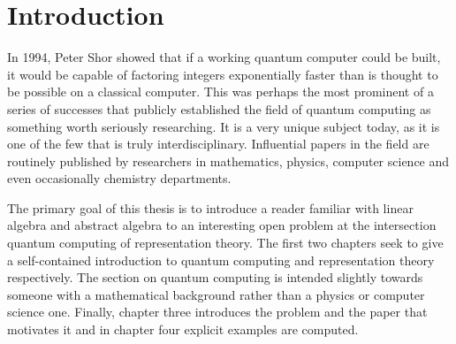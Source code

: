 \chapter*{Introduction}


In 1994, Peter Shor showed that if a working quantum computer could be built, it would be capable of factoring 
integers exponentially faster than is thought to be possible on a classical computer. This was perhaps the most 
prominent of a series of successes that publicly established the field of quantum computing as something worth 
seriously researching. It is a very unique subject today, as it is one of the few that is truly interdisciplinary.  
Influential papers in the field are routinely published by researchers in mathematics, physics, computer science 
and even occasionally chemistry departments. 

The primary goal of this thesis is to introduce a reader familiar with linear algebra and abstract algebra to an 
interesting open problem at the intersection quantum computing of representation theory. The first two chapters 
seek to give a self-contained introduction to quantum computing and representation theory respectively. The section 
on quantum computing is intended slightly towards someone with a mathematical background rather than a physics or 
computer science one. Finally, chapter three introduces the problem and the paper that motivates it and in chapter 
four explicit examples are computed.
    

